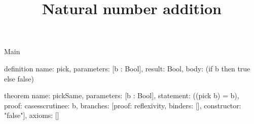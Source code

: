\begin{lexlean}{Main}
\title{Natural number addition}
\begin{semanticmodule}
definition{
  name: pick,
  parameters: [b : Bool],
  result: Bool,
  body: (if b then true else false)
}

theorem{
  name: pickSame,
  parameters: [b : Bool],
  statement: ((pick b) = b),
  proof: cases{scrutinee: b, branches: [{proof: reflexivity{}, binders: [], constructor: "false"}]},
  axioms: []
}
\end{semanticmodule}
\end{lexlean}
